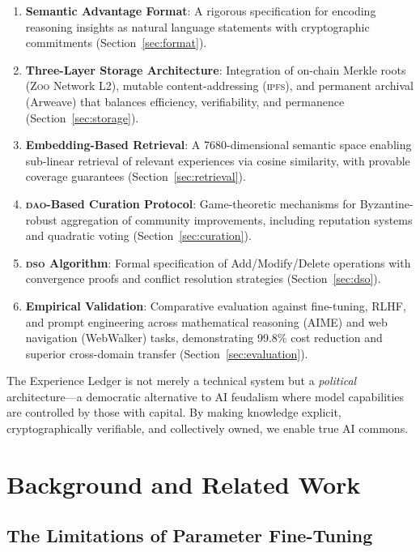 \documentclass[11pt,letterpaper]{article}
\newcommand{\Zoo}{\textsc{Zoo}}
\newcommand{\DSO}{\textsc{dso}}
\newcommand{\DAO}{\textsc{dao}}
\newcommand{\IPFS}{\textsc{ipfs}}
\begin{document}
\begin{enumerate}
    \item \textbf{Semantic Advantage Format}: A rigorous specification for encoding reasoning insights as natural language statements with cryptographic commitments (Section~\ref{sec:format}).
    
    \item \textbf{Three-Layer Storage Architecture}: Integration of on-chain Merkle roots (\Zoo{} Network L2), mutable content-addressing (\IPFS{}), and permanent archival (Arweave) that balances efficiency, verifiability, and permanence (Section~\ref{sec:storage}).
    
    \item \textbf{Embedding-Based Retrieval}: A 7680-dimensional semantic space enabling sub-linear retrieval of relevant experiences via cosine similarity, with provable coverage guarantees (Section~\ref{sec:retrieval}).
    
    \item \textbf{\DAO{}-Based Curation Protocol}: Game-theoretic mechanisms for Byzantine-robust aggregation of community improvements, including reputation systems and quadratic voting (Section~\ref{sec:curation}).
    
    \item \textbf{\DSO{} Algorithm}: Formal specification of Add/Modify/Delete operations with convergence proofs and conflict resolution strategies (Section~\ref{sec:dso}).
    
    \item \textbf{Empirical Validation}: Comparative evaluation against fine-tuning, RLHF, and prompt engineering across mathematical reasoning (AIME) and web navigation (WebWalker) tasks, demonstrating 99.8\% cost reduction and superior cross-domain transfer (Section~\ref{sec:evaluation}).
\end{enumerate}

The Experience Ledger is not merely a technical system but a \textit{political} architecture—a democratic alternative to AI feudalism where model capabilities are controlled by those with capital. By making knowledge explicit, cryptographically verifiable, and collectively owned, we enable true AI commons.

\section{Background and Related Work}

\subsection{The Limitations of Parameter Fine-Tuning}
\end{document}
